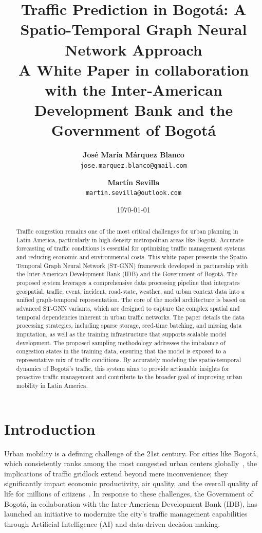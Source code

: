 \documentclass[11pt, a4paper]{article}
\title{\textbf{Traffic Prediction in Bogotá: A Spatio-Temporal Graph Neural Network Approach}\\
\large A White Paper in collaboration with the Inter-American Development Bank and the Government of Bogotá}
\author{
    \textbf{José María Márquez Blanco} \\
    \texttt{jose.marquez.blanco@gmail.com}
    \and
    \textbf{Martín Sevilla} \\
    \texttt{martin.sevilla@outlook.com}
}
\date{\today}
\begin{document}
\maketitle

\begin{abstract}
\noindent Traffic congestion remains one of the most critical challenges for urban planning in Latin America, particularly in high-density metropolitan areas like Bogotá. Accurate forecasting of traffic conditions is essential for optimizing traffic management systems and reducing economic and environmental costs. This white paper presents the Spatio-Temporal Graph Neural Network (ST-GNN) framework developed in partnership with the Inter-American Development Bank (IDB) and the Government of Bogotá. The proposed system leverages a comprehensive data processing pipeline that integrates geospatial, traffic, event, incident, road-state, weather, and urban context data into a unified graph-temporal representation. The core of the model architecture is based on advanced ST-GNN variants, which are designed to capture the complex spatial and temporal dependencies inherent in urban traffic networks. The paper details the data processing strategies, including sparse storage, seed-time batching, and missing data imputation, as well as the training infrastructure that supports scalable model development. The proposed sampling methodology addresses the imbalance of congestion states in the training data, ensuring that the model is exposed to a representative mix of traffic conditions. By accurately modeling the spatio-temporal dynamics of Bogotá's traffic, this system aims to provide actionable insights for proactive traffic management and contribute to the broader goal of improving urban mobility in Latin America.
\end{abstract}

\section{Introduction}

Urban mobility is a defining challenge of the 21st century. For cities like Bogotá, which consistently ranks among the most congested urban centers globally~\cite{akbar2023fast}, the implications of traffic gridlock extend beyond mere inconvenience; they significantly impact economic productivity, air quality, and the overall quality of life for millions of citizens~\cite{bedoyamaya2022estimating, levy2010evaluation}. In response to these challenges, the Government of Bogotá, in collaboration with the Inter-American Development Bank (IDB), has launched an initiative to modernize the city's traffic management capabilities through Artificial Intelligence (AI) and data-driven decision-making.
\end{document}
